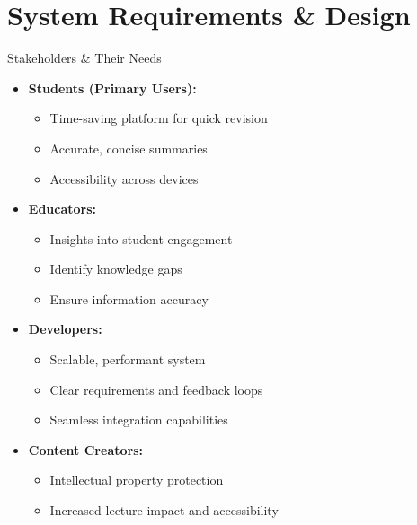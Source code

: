 \documentclass{beamer}
\begin{document}
\section{System Requirements \& Design}

\begin{frame}{Stakeholders \& Their Needs}
    \begin{itemize}
        \item \textbf{Students (Primary Users):}
            \begin{itemize}
                \item Time-saving platform for quick revision
                \item Accurate, concise summaries
                \item Accessibility across devices
            \end{itemize}
        
        \item \textbf{Educators:}
            \begin{itemize}
                \item Insights into student engagement
                \item Identify knowledge gaps
                \item Ensure information accuracy
            \end{itemize}
        
        \item \textbf{Developers:}
            \begin{itemize}
                \item Scalable, performant system
                \item Clear requirements and feedback loops
                \item Seamless integration capabilities
            \end{itemize}
        
        \item \textbf{Content Creators:}
            \begin{itemize}
                \item Intellectual property protection
                \item Increased lecture impact and accessibility
            \end{itemize}
    \end{itemize}
\end{frame}
\end{document}
